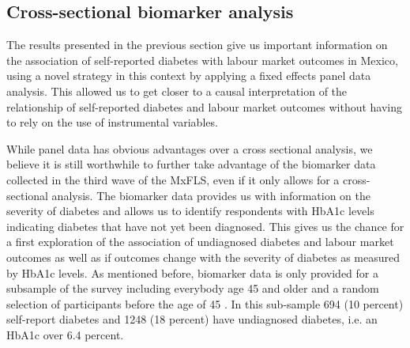 \subsection{Cross-sectional biomarker analysis}

The results presented in the previous section give us important information
on the association of self-reported diabetes with labour market outcomes
in Mexico, using a novel strategy in this context by applying a fixed
effects panel data analysis. This allowed us to get closer to a causal
interpretation of the relationship of self-reported diabetes and labour
market outcomes without having to rely on the use of instrumental
variables. 

While panel data has obvious advantages over a cross sectional analysis,
we believe it is still worthwhile to further take advantage of the
biomarker data collected in the third wave of the \ac{MxFLS}, even
if it only allows for a cross-sectional analysis. The biomarker data
provides us with information on the severity of diabetes and allows
us to identify respondents with \ac{HbA1c} levels indicating diabetes
that have not yet been diagnosed. This gives us the chance for a first
exploration of the association of undiagnosed diabetes and labour
market outcomes as well as if outcomes change with the severity of
diabetes as measured by \ac{HbA1c} levels. As mentioned before, biomarker
data is only provided for a subsample of the survey including everybody
age 45 and older and a random selection of participants before the
age of 45 \citep{Crimmins2015}. In this sub-sample 694 (10 percent)
self-report diabetes and 1248 (18 percent) have undiagnosed diabetes,
i.e. an \ac{HbA1c} over 6.4 percent.

  